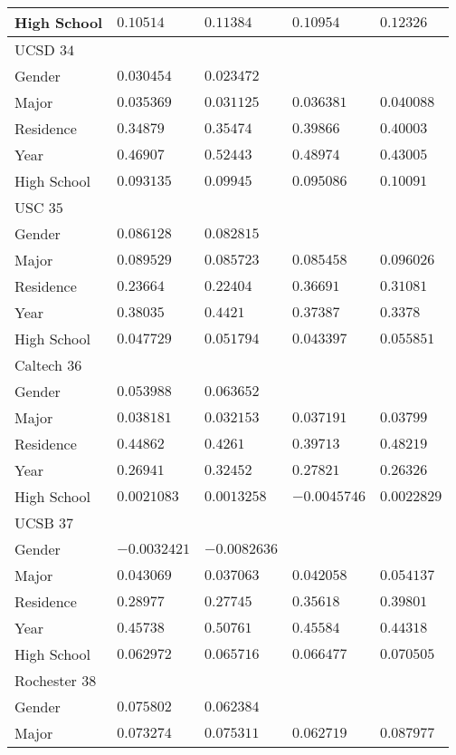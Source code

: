 \begin{center}
\begin{longtable}{|l|l|l|l|l|}
High School & $0.10514$ & $0.11384$ & $0.10954$ & $0.12326$ \\ \hline \hline
UCSD $34$ & & &   \\ \hline
Gender & $0.030454$ & $0.023472$ & & \\
Major & $0.035369$ & $0.031125$ & $0.036381$ & $0.040088$ \\
Residence & $0.34879$ & $0.35474$ & $0.39866$ & $0.40003$ \\
Year & $0.46907$ & $0.52443$ & $0.48974$ & $0.43005$ \\
High School & $0.093135$ & $0.09945$ & $0.095086$ & $0.10091$ \\ \hline \hline
USC $35$ & & &   \\ \hline
Gender & $0.086128$ & $0.082815$ & & \\
Major & $0.089529$ & $0.085723$ & $0.085458$ & $0.096026$ \\
Residence & $0.23664$ & $0.22404$ & $0.36691$ & $0.31081$ \\
Year & $0.38035$ & $0.4421$ & $0.37387$ & $0.3378$ \\
High School & $0.047729$ & $0.051794$ & $0.043397$ & $0.055851$ \\ \hline \hline
Caltech $36$ & & &   \\ \hline
Gender & $0.053988$ & $0.063652$ & & \\
Major & $0.038181$ & $0.032153$ & $0.037191$ & $0.03799$ \\
Residence & $0.44862$ & $0.4261$ & $0.39713$ & $0.48219$ \\
Year & $0.26941$ & $0.32452$ & $0.27821$ & $0.26326$ \\
High School & $0.0021083$ & $0.0013258$ & $-0.0045746$ & $0.0022829$ \\ \hline \hline
UCSB $37$ & & &   \\ \hline
Gender & $-0.0032421$ & $-0.0082636$ & & \\
Major & $0.043069$ & $0.037063$ & $0.042058$ & $0.054137$ \\
Residence & $0.28977$ & $0.27745$ & $0.35618$ & $0.39801$ \\
Year & $0.45738$ & $0.50761$ & $0.45584$ & $0.44318$ \\
High School & $0.062972$ & $0.065716$ & $0.066477$ & $0.070505$ \\ \hline \hline
Rochester $38$ & & &   \\ \hline
Gender & $0.075802$ & $0.062384$ & & \\
Major & $0.073274$ & $0.075311$ & $0.062719$ & $0.087977$ \\

\end{longtable}
\end{center}
